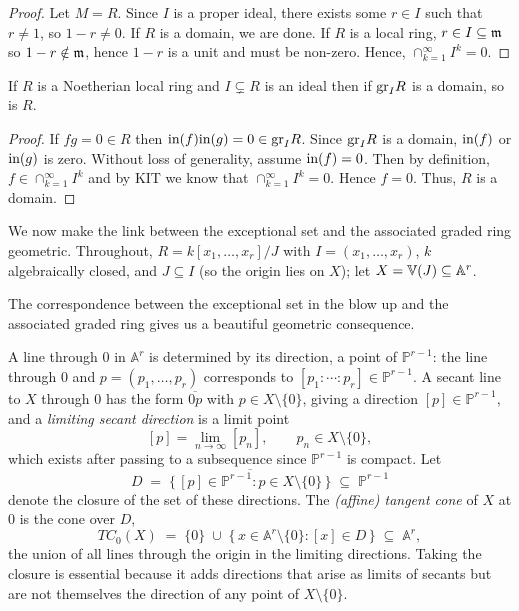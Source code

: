 \documentclass[12pt]{amsproc}
\begin{document}
    \begin{proof}
        Let $M = R$. Since $I$ is a proper ideal, there exists some $r \in I$ such that $r \neq 1$, so $1 - r \neq 0$. If $R$ is a domain, we are done. If $R$ is a local ring, $r \in I \subseteq \operatorname{\mathfrak{m}}$ so $1 - r \notin \operatorname{\mathfrak{m}}$, hence $1-r$ is a unit and must be non-zero. Hence, $\cap_{k=1}^\infty I^k = 0$.
    \end{proof}

    \begin{corollary}
        If $R$ is a Noetherian local ring and $I \subsetneq R$ is an ideal then if $\text{gr}_I R$ is a domain, so is $R$.  
    \end{corollary}

    \begin{proof}
        If $fg = 0 \in R$ then $\text{in}(f) \text{in}(g) = 0 \in \text{gr}_I R$. Since $\text{gr}_I R$ is a domain, $\text{in} (f)$ or $\text{in}(g)$ is zero. Without loss of generality, assume $\text{in}(f) = 0$. Then by definition, $f \in \cap_{k=1}^\infty I^k$ and by KIT we know that $\cap_{k=1}^\infty I^k = 0$. Hence $f = 0$. Thus, $R$ is a domain. 
    \end{proof}

    We now make the link between the exceptional set and the associated graded ring geometric. Throughout, $R = k[x_1, \ldots, x_r]/J$ with $I = (x_1, \ldots, x_r)$, $k$ algebraically closed, and $J \subseteq I$ (so the origin lies on $X$); let $X = \mathbb V(J) \subseteq \mathbb A^r$. 

    The correspondence between the exceptional set in the blow up and the associated graded ring gives us a beautiful geometric consequence. 
     \begin{definition}
        A line through $0$ in $\mathbb{A}^r$ is determined by its direction, a point of
        $\mathbb{P}^{r-1}$: the line through $0$ and $p=(p_1,\dots,p_r)$ corresponds to
        $[p_1:\cdots:p_r]\in\mathbb{P}^{r-1}$. A secant line to $X$ through $0$ has the
        form $\overline{0p}$ with $p\in X\setminus\{0\}$, giving a direction
        $[p]\in\mathbb{P}^{r-1}$, and a \emph{limiting secant direction} is a limit point
        \[
        [p]=\lim_{n\to\infty}[p_n],\qquad p_n\in X\setminus\{0\},
        \]
        which exists after passing to a subsequence since $\mathbb{P}^{r-1}$ is compact. Let
        \[
        D \;=\; \overline{\{\,[p]\in\mathbb{P}^{r-1} : p\in X\setminus\{0\}\,\}}
            \;\subseteq\;\mathbb{P}^{r-1}
        \]
        denote the closure of the set of these directions. The \emph{(affine) tangent cone}
        of $X$ at $0$ is the cone over $D$,
        \[
        TC_0(X)\;=\;\{0\}\;\cup\;\{\,x\in\mathbb{A}^r\setminus\{0\} : [x]\in D\,\}
                \;\subseteq\;\mathbb{A}^r,
        \]
        the union of all lines through the origin in the limiting directions. Taking the
        closure is essential because it adds directions that arise as limits of secants but are not themselves the direction of any point of $X\setminus\{0\}$.
    \end{definition}
\end{document}
